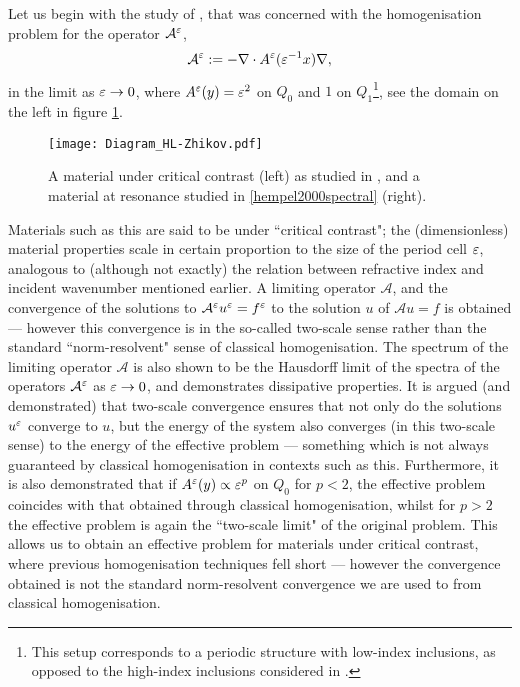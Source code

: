 Let us begin with the study of \cite{zhikov2000extension}, that was concerned with the homogenisation problem for the operator $\mathcal{A}^{\varepsilon}$,
\begin{align*}
	\mathcal{A}^{\varepsilon} := -\nabla\cdot A^{\varepsilon}(\varepsilon^{-1}x)\nabla,
\end{align*}
in the limit as $\varepsilon\rightarrow0$, where $A^{\varepsilon}(y)=\varepsilon^2$ on $Q_0$ and $1$ on $Q_1$\footnote{This setup corresponds to a periodic structure with low-index inclusions, as opposed to the high-index inclusions considered in \cite{movchan2001noncommuting} .}, see the domain on the left in figure \ref{fig:Diagram_HL-Zhikov}.
\begin{figure}[b]
	\centering
	\texttt{[image: Diagram\_HL-Zhikov.pdf]}
	\caption{\label{fig:Diagram_HL-Zhikov} A material under critical contrast (left) as studied in \cite{zhikov2000extension}, and a material at resonance studied in \ref{hempel2000spectral} (right).}
\end{figure}
Materials such as this are said to be under ``critical contrast"; the (dimensionless) material properties scale in certain proportion to the size of the period cell $\varepsilon$, analogous to (although not exactly) the relation between refractive index and incident wavenumber mentioned earlier.
A limiting operator $\mathcal{A}$, and the convergence of the solutions to $\mathcal{A}^{\varepsilon}u^{\varepsilon}=f^{\varepsilon}$ to the solution $u$ of $\mathcal{A}u=f$ is obtained --- however this convergence is in the so-called two-scale sense rather than the standard ``norm-resolvent" sense of classical homogenisation.
The spectrum of the limiting operator $\mathcal{A}$ is also shown to be the Hausdorff limit of the spectra of the operators $\mathcal{A}^{\varepsilon}$ as $\varepsilon\rightarrow0$, and demonstrates dissipative properties.
It is argued (and demonstrated) that two-scale convergence ensures that not only do the solutions $u^{\varepsilon}$ converge to $u$, but the energy of the system also converges (in this two-scale sense) to the energy of the effective problem --- something which is not always guaranteed by classical homogenisation in contexts such as this. 
Furthermore, it is also demonstrated that if $A^{\varepsilon}(y)\propto\varepsilon^p$ on $Q_0$ for $p<2$, the effective problem coincides with that obtained through classical homogenisation, whilst for $p>2$ the effective problem is again the ``two-scale limit" of the original problem.
This allows us to obtain an effective problem for materials under critical contrast, where previous homogenisation techniques fell short --- however the convergence obtained is not the standard norm-resolvent convergence we are used to from classical homogenisation.

